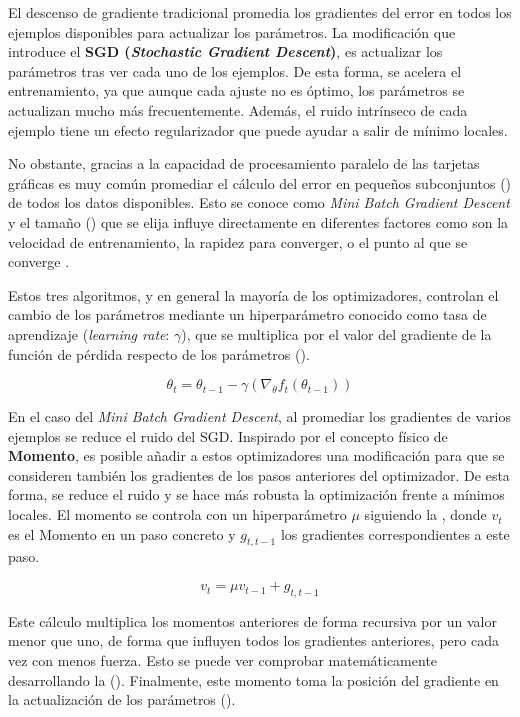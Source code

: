 El descenso de gradiente tradicional promedia los gradientes del error en todos los ejemplos disponibles para actualizar los parámetros. La modificación que introduce el \textbf{SGD (\textit{Stochastic Gradient Descent})}, es actualizar los parámetros tras ver cada uno de los ejemplos. De esta forma, se acelera el entrenamiento, ya que aunque cada ajuste no es óptimo, los parámetros se actualizan mucho más frecuentemente. Además, el ruido intrínseco de cada ejemplo tiene un efecto regularizador que puede ayudar a salir de mínimo locales.

No obstante, gracias a la capacidad de procesamiento paralelo de las tarjetas gráficas es muy común promediar el cálculo del error en pequeños subconjuntos () de todos los datos disponibles. Esto se conoce como \textit{Mini Batch Gradient Descent} y el tamaño () que se elija influye directamente en diferentes factores como son la velocidad de entrenamiento, la rapidez para converger, o el punto al que se converge \cite{on-large-batch}.

Estos tres algoritmos, y en general la mayoría de los optimizadores, controlan el cambio de los parámetros mediante un hiperparámetro conocido como tasa de aprendizaje (\textit{learning rate}: $\gamma$), que se multiplica por el valor del gradiente de la función de pérdida respecto de los parámetros ().

\begin{equation}
\label{eqn:sgd}
\theta_t = \theta_{t-1} - \gamma (\nabla_{\theta} f_t(\theta_{t-1}))
\end{equation}

En el caso del \textit{Mini Batch Gradient Descent}, al promediar los gradientes de varios ejemplos se reduce el ruido del SGD. Inspirado por el concepto físico de \textbf{Momento}, es posible añadir a estos optimizadores una modificación para que se consideren también los gradientes de los pasos anteriores del optimizador. De esta forma, se reduce el ruido y se hace más robusta la optimización frente a mínimos locales. El momento se controla con un hiperparámetro $\mu$ siguiendo la , donde $v_t$ es el Momento en un paso concreto y $g_{t, t-1}$ los gradientes correspondientes a este paso. 

\begin{equation}
\label{eqn:momento}
v_t = \mu v_{t-1} + g_{t, t-1}
\end{equation}

Este cálculo multiplica los momentos anteriores de forma recursiva por un valor menor que uno, de forma que influyen todos los gradientes anteriores, pero cada vez con menos fuerza. Esto se puede ver comprobar matemáticamente desarrollando la  (). Finalmente, este momento toma la posición del gradiente en la actualización de los parámetros ().

